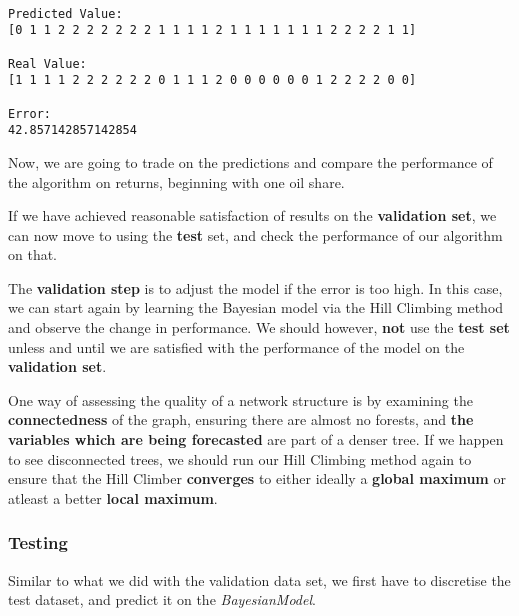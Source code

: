 \documentclass[11pt]{article}
\begin{document}
    \begin{Verbatim}[commandchars=\\\{\}]

Predicted Value: 
[0 1 1 2 2 2 2 2 2 2 1 1 1 1 2 1 1 1 1 1 1 1 2 2 2 2 1 1]

Real Value: 
[1 1 1 1 2 2 2 2 2 2 0 1 1 1 2 0 0 0 0 0 0 1 2 2 2 2 0 0]

Error: 
42.857142857142854

    \end{Verbatim}

    Now, we are going to trade on the predictions and compare the
performance of the algorithm on returns, beginning with one oil share.

    If we have achieved reasonable satisfaction of results on the
\textbf{validation set}, we can now move to using the \textbf{test} set,
and check the performance of our algorithm on that.

The \textbf{validation step} is to adjust the model if the error is too
high. In this case, we can start again by learning the Bayesian model
via the Hill Climbing method and observe the change in performance. We
should however, \textbf{not} use the \textbf{test set} unless and until
we are satisfied with the performance of the model on the
\textbf{validation set}.

One way of assessing the quality of a network structure is by examining
the \textbf{connectedness} of the graph, ensuring there are almost no
forests, and \textbf{the variables which are being forecasted} are part
of a denser tree. If we happen to see disconnected trees, we should run
our Hill Climbing method again to ensure that the Hill Climber
\textbf{converges} to either ideally a \textbf{global maximum} or
atleast a better \textbf{local maximum}.

\hypertarget{testing}{%
\subsubsection{Testing}\label{testing}}

Similar to what we did with the validation data set, we first have to
discretise the test dataset, and predict it on the \emph{BayesianModel}.
\end{document}
